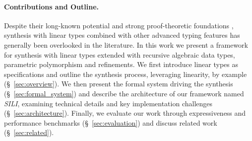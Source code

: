 \documentclass{llncs}
\newcommand{\mypara}[1]{\paragraph{\textbf{#1}.}}
\newcommand{\synname}{\emph{SILI}}
\begin{document}
\paragraph{Contributions and Outline.} Despite their long-known potential
\cite{Wadler90lineartypes,DBLP:journals/mscs/CairesPT16,Bernardy_2018}
and strong proof-theoretic
foundations
\cite{10.1093/logcom/2.3.297,DBLP:conf/cade/ChaudhuriP05,DBLP:journals/tcs/CervesatoHP00},
synthesis with linear types combined with other advanced typing features
has generally been overlooked in the literature.  In this work we present a framework for synthesis
with linear types extended with recursive algebraic data types, parametric
polymorphism and refinements.
We first introduce linear types as specifications
and outline the synthesis process, leveraging linearity, by example
(\S~\ref{sec:overview}). We then present the formal system driving the
synthesis (\S~\ref{sec:formal_system}) and describe the architecture
of our framework named \synname, examining technical details and key
implementation challenges (\S~\ref{sec:architecture}). Finally, 
we evaluate our work through expressiveness and performance benchmarks
(\S~\ref{sec:evaluation}) and discuss related work
(\S~\ref{sec:related}).



\end{document}
